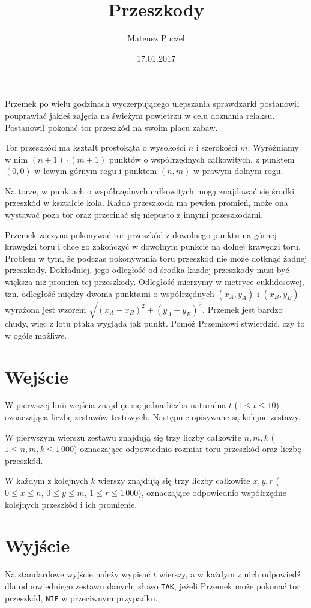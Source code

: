 \documentclass[zad,zawodnik,utf8]{sinol}
\title{Przeszkody}
\author{Mateusz Puczel} %
\date{17.01.2017}
\begin{document}
\begin{tasktext}%

Przemek po wielu godzinach wyczerpującego ulepszania sprawdzarki postanowił pouprawiać jakieś zajęcia na świeżym powietrzu w celu doznania relaksu.
Postanowił pokonać tor przeszkód na swoim placu zabaw.

Tor przeszkód ma kształt prostokąta o wysokości $n$ i szerokości $m$. Wyróżniamy w nim $(n+1)\cdot (m+1)$ punktów o współrzędnych całkowitych,
z punktem $(0, 0)$ w lewym górnym rogu i punktem $(n, m)$ w prawym dolnym rogu.

Na torze, w punktach o współrzędnych całkowitych mogą znajdować się środki przeszkód w kształcie koła. Każda przeszkoda ma pewien promień, może ona wystawać
poza tor oraz przecinać się niepusto z innymi przeszkodami.

Przemek zaczyna pokonywać tor przeszkód z dowolnego punktu na górnej krawędzi toru i chce go zakończyć w dowolnym punkcie na dolnej krawędzi toru.
Problem w tym, że podczas pokonywania toru przeszkód nie może dotknąć żadnej przeszkody. Dokładniej, jego odległość od środka każdej przeszkody
musi być większa niż promień tej przeszkody. Odległość mierzymy w metryce euklidesowej, tzn. odległość między dwoma punktami o współrzędnych
$(x_A, y_A)$ i $(x_B, y_B)$ wyrażona jest wzorem $\sqrt{(x_A-x_B)^2 + (y_A-y_B)^2}$.
Przemek jest bardzo chudy, więc z lotu ptaka wygląda jak punkt.
Pomoż Przemkowi stwierdzić, czy to w ogóle możliwe.

  \section{Wejście}
W pierwszej linii wejścia znajduje się jedna liczba naturalna $t$ ($1 \leq t \leq 10$) oznaczająca liczbę zestawów testowych. Następnie opisywane są kolejne zestawy.

W pierwszym wierszu zestawu znajdują się trzy liczby całkowite $n, m, k$ ($1 \leq n, m, k \leq 1\,000$) oznaczające odpowiednio rozmiar toru przeszkód oraz liczbę przeszkód.

W każdym z kolejnych $k$ wierszy znajdują się trzy liczby całkowite $x, y, r$ ($0 \leq x \leq n$, $0 \leq y \leq m$, $1 \leq r \leq 1\,000$), oznaczające odpowiednio współrzędne kolejnych przeszkód i ich promienie.
  \section{Wyjście}
Na standardowe wyjście należy wypisać $t$ wierszy, a w każdym z nich odpowiedź dla odpowiedniego zestawu danych: słowo \texttt{TAK}, jeżeli Przemek
może pokonać tor przeszkód, \texttt{NIE} w przeciwnym przypadku.

\makecompactexample
\end{tasktext}
\end{document}
